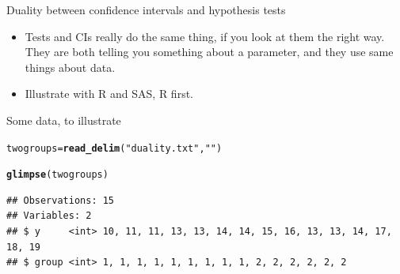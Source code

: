 \documentclass[unknownkeysallowed]{beamer}\usepackage[]{graphicx}\usepackage[]{color}
\makeatletter
\newcommand{\hlstr}[1]{\textcolor[rgb]{0.192,0.494,0.8}{#1}}%
\newcommand{\hlstd}[1]{\textcolor[rgb]{0.345,0.345,0.345}{#1}}%
\newcommand{\hlkwb}[1]{\textcolor[rgb]{0.69,0.353,0.396}{#1}}%
\newcommand{\hlkwd}[1]{\textcolor[rgb]{0.737,0.353,0.396}{\textbf{#1}}}%
\newenvironment{kframe}{%
 \def\at@end@of@kframe{}%
 \ifinner\ifhmode%
  \def\at@end@of@kframe{\end{minipage}}%
  \begin{minipage}{\columnwidth}%
 \fi\fi%
 \def\FrameCommand##1{\hskip\@totalleftmargin \hskip-\fboxsep
 \colorbox{shadecolor}{##1}\hskip-\fboxsep
     \hskip-\linewidth \hskip-\@totalleftmargin \hskip\columnwidth}%
 \MakeFramed {\advance\hsize-\width
   \@totalleftmargin\z@ \linewidth\hsize
   \@setminipage}}%
 {\par\unskip\endMakeFramed%
 \at@end@of@kframe}
\newenvironment{knitrout}{}{} %
\makeatother
\begin{document}
\begin{frame}[fragile]{Duality between confidence intervals and
    hypothesis tests}

  \begin{itemize}
  \item Tests and CIs really do the same thing, if you look at them
    the right way. They are both telling you something about a
    parameter, and they use same things about data.
  \item Illustrate with R and SAS, R first.


  \end{itemize}
  
\end{frame}

\begin{frame}[fragile]{Some data, to illustrate}
  
\begin{knitrout}
\color{fgcolor}\begin{kframe}
\begin{alltt}
\hlstd{twogroups}\hlkwb{=}\hlkwd{read_delim}\hlstd{(}\hlstr{"duality.txt"}\hlstd{,}\hlstr{" "}\hlstd{)}
\end{alltt}


{\ttfamily\noindent\itshape\color{messagecolor}{\#\# Parsed with column specification:\\\#\# cols(\\\#\#\ \  y = col\_integer(),\\\#\#\ \  group = col\_integer()\\\#\# )}}\begin{alltt}
\hlkwd{glimpse}\hlstd{(twogroups)}
\end{alltt}
\begin{verbatim}
## Observations: 15
## Variables: 2
## $ y     <int> 10, 11, 11, 13, 13, 14, 14, 15, 16, 13, 13, 14, 17, 18, 19
## $ group <int> 1, 1, 1, 1, 1, 1, 1, 1, 1, 2, 2, 2, 2, 2, 2
\end{verbatim}
\end{kframe}
\end{knitrout}
  
\end{frame}
\end{document}
